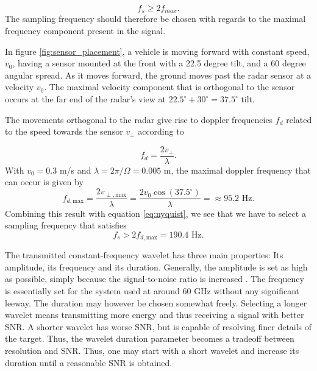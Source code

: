 \begin{equation}
\label{eq:nyquist}
		f_{s} \geq 2f_{max}.
\end{equation}
The sampling frequency should therefore be chosen with regards to the maximal frequency component present in the signal. 

In figure \ref{fig:sensor_placement}, a vehicle is moving forward with constant speed, $v_0$, having a sensor mounted at the front with a 22.5 degree tilt, and a 60 degree angular spread. As it moves forward, the ground moves past the radar sensor at a velocity $v_0$. The maximal velocity component that is orthogonal to the sensor occurs at the far end of the radar's view at $22.5^\circ + 30^\circ = 37.5^\circ$ tilt. 

The movements orthogonal to the radar give rise to doppler frequencies $f_d$ related to the speed towards the sensor $v_\perp$ according to \citep{lien_gillian_karagozler_amihood_schwesig_olson_raja_poupyrev_2016}

\begin{equation}
	f_{d} = \frac{2v_\perp}{\lambda}.
\end{equation}
With $v_0=0.3$ m/s and $\lambda = 2\pi/\Omega = 0.005$ m, the maximal doppler frequency that can occur is given by 
\begin{equation}
	f_{d,\textrm{max}} 
	=\frac{2 v_{\perp, \textrm{max}}}{\lambda} 
	= \frac{2 v_0\cos(37.5^\circ)}{\lambda}
	= \approx 95.2 \text { Hz}.
\end{equation}
Combining this result with equation \eqref{eq:nyquist}, we see that we have to select  a sampling frequency that satisfies
\begin{equation}
	f_s > 2f_{d,\textrm{max}} = 190.4 \text{ Hz}.
\end{equation}

The transmitted constant-frequency wavelet has three main properties: Its amplitude, its frequency and its duration. Generally, the amplitude is set as high as possible, simply because the signal-to-noise ratio is increased \citep{richards_2014}. The frequency is essentially set for the system used at around 60 GHz without any significant leeway. The duration may however be chosen somewhat freely. Selecting a longer wavelet means transmitting more energy and thus receiving a signal with better SNR. A shorter wavelet has worse SNR, but is capable of resolving finer details of the target. Thus, the wavelet duration parameter becomes a tradeoff between resolution and SNR. Thus, one may start with a short wavelet and increase its duration until a reasonable SNR is obtained.  

